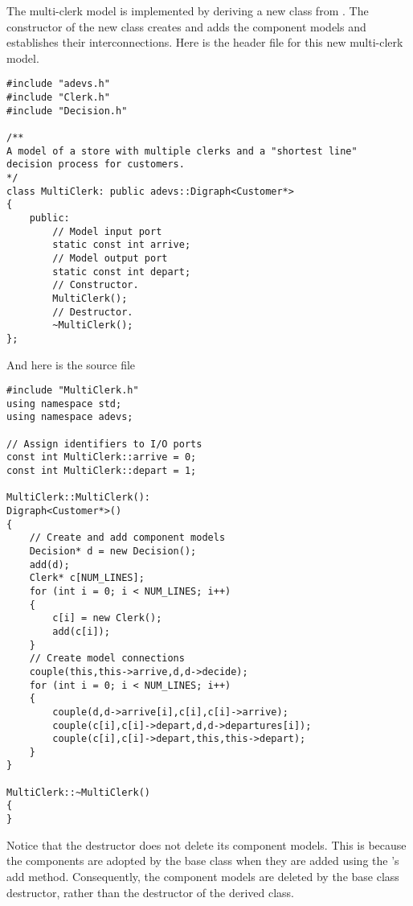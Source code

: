 The multi-clerk model is implemented by deriving a new class from . The constructor of the new class creates and adds the component models and establishes their interconnections. Here is the header file for this new multi-clerk model.
\begin{verbatim}
#include "adevs.h"
#include "Clerk.h"
#include "Decision.h"

/**
A model of a store with multiple clerks and a "shortest line"
decision process for customers.
*/
class MultiClerk: public adevs::Digraph<Customer*>
{
    public:
        // Model input port
        static const int arrive;
        // Model output port
        static const int depart;
        // Constructor.
        MultiClerk();
        // Destructor.
        ~MultiClerk();
};
\end{verbatim}
And here is the source file
\begin{verbatim}
#include "MultiClerk.h"
using namespace std;
using namespace adevs;

// Assign identifiers to I/O ports
const int MultiClerk::arrive = 0;
const int MultiClerk::depart = 1;

MultiClerk::MultiClerk():
Digraph<Customer*>()
{
    // Create and add component models
    Decision* d = new Decision();
    add(d);
    Clerk* c[NUM_LINES];
    for (int i = 0; i < NUM_LINES; i++)
    {
        c[i] = new Clerk();
        add(c[i]);
    }
    // Create model connections
    couple(this,this->arrive,d,d->decide);
    for (int i = 0; i < NUM_LINES; i++)
    {
        couple(d,d->arrive[i],c[i],c[i]->arrive);
        couple(c[i],c[i]->depart,d,d->departures[i]);
        couple(c[i],c[i]->depart,this,this->depart);
    }
}

MultiClerk::~MultiClerk()
{
}
\end{verbatim}
Notice that the  destructor does not delete its component models. This is because the components are adopted by the base class when they are added using the 's add method. Consequently, the component models are deleted by the base class destructor, rather than the destructor of the derived class.

